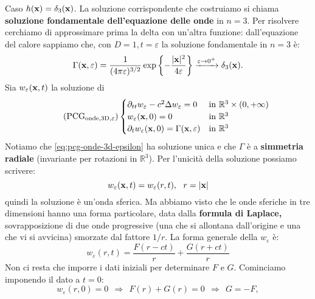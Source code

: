 Caso $\displaystyle h(\mathbf{x}) =\delta _{3}(\mathbf{x})$. La soluzione corrispondente che costruiamo si chiama \textbf{soluzione fondamentale dell'equazione delle onde} in $n=3$. Per risolvere cerchiamo di approssimare prima la delta con un'altra funzione: dall'equazione del calore sappiamo che, con $\displaystyle D=1,t=\varepsilon $ la soluzione fondamentale in $n=3$ è:
\begin{equation*}
    \Gamma (\mathbf{x} ,\varepsilon) =\frac{1}{(4\pi \varepsilon)^{3/2}}\exp\left\{-\frac{| \mathbf{x}| ^{2}}{4\varepsilon }\right\}\xrightarrow{\varepsilon \rightarrow 0^{+}} \delta _{3}(\mathbf{x}) .
\end{equation*}
Sia $\displaystyle w_{\varepsilon }(\mathbf{x} ,t)$ la soluzione di
\begin{equation*}
    \tag{PCG$_{\text{onde,3D},\varepsilon}$}
    \begin{cases}
        \partial _{tt} w_{\varepsilon } -c^{2} \Delta w_{\varepsilon } =0 & \text{in} \ \mathbb{R}^{3} \times (0,+\infty) \\
        w_{\varepsilon }(\x ,0) =0                                        & \text{in} \ \mathbb{R}^{3}                    \\
        \partial _{t} w_{\varepsilon }(\x ,0) =\Gamma (\x ,\varepsilon)   & \text{in} \ \mathbb{R}^{3}
    \end{cases}
    \label{eq:pcg-onde-3d-epsilon}
\end{equation*}
Notiamo che \eqref{eq:pcg-onde-3d-epsilon} ha soluzione unica e che $\displaystyle \Gamma $ è a \textbf{simmetria radiale} (invariante per rotazioni in $\displaystyle \mathbb{R}^{3}$). Per l'unicità della soluzione possiamo scrivere:
\begin{equation*}
    w_{\varepsilon }(\x ,t) =w_{\varepsilon }(r,t) ,\ \ r=| \x|
\end{equation*}
quindi la soluzione è un'onda sferica. Ma abbiamo visto che le onde sferiche in tre dimensioni hanno una forma particolare, data dalla \textbf{formula di Laplace, }sovrapposizione di due onde progressive (una che si allontana dall'origine e una che vi si avvicina) smorzate dal fattore $1/r$. La forma generale della $\displaystyle w_{\varepsilon }$ è:
\begin{equation*}
    w_{\varepsilon }(r,t) =\frac{F(r-ct)}{r} +\frac{G(r+ct)}{r}
\end{equation*}
Non ci resta che imporre i dati iniziali per determinare $F$ e $G$. Cominciamo imponendo il dato a $t=0$:
\begin{equation*}
    w_{\varepsilon }(r,0) =0\ \ \Rightarrow \ \ F(r) +G(r) =0\ \ \Rightarrow \ \ G=-F,
\end{equation*}
